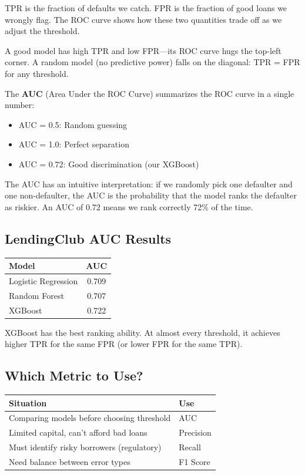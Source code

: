 \documentclass[11pt,a4paper]{article}
\newcommand{\keyword}[1]{\textbf{\textcolor{AccentOrange}{#1}}}
\begin{document}
TPR is the fraction of defaults we catch. FPR is the fraction of good loans we wrongly flag. The ROC curve shows how these two quantities trade off as we adjust the threshold.

A good model has high TPR and low FPR---its ROC curve hugs the top-left corner. A random model (no predictive power) falls on the diagonal: TPR = FPR for any threshold.

The \keyword{AUC} (Area Under the ROC Curve) summarizes the ROC curve in a single number:
\begin{itemize}
    \item AUC = 0.5: Random guessing
    \item AUC = 1.0: Perfect separation
    \item AUC = 0.72: Good discrimination (our XGBoost)
\end{itemize}

The AUC has an intuitive interpretation: if we randomly pick one defaulter and one non-defaulter, the AUC is the probability that the model ranks the defaulter as riskier. An AUC of 0.72 means we rank correctly 72\% of the time.

\subsection{LendingClub AUC Results}

\begin{center}
\begin{tabular}{lc}
\toprule
\textbf{Model} & \textbf{AUC} \\
\midrule
Logistic Regression & 0.709 \\
Random Forest & 0.707 \\
XGBoost & 0.722 \\
\bottomrule
\end{tabular}
\end{center}

XGBoost has the best ranking ability. At almost every threshold, it achieves higher TPR for the same FPR (or lower FPR for the same TPR).

\subsection{Which Metric to Use?}

\begin{center}
\begin{tabular}{ll}
\toprule
\textbf{Situation} & \textbf{Use} \\
\midrule
Comparing models before choosing threshold & AUC \\
Limited capital, can't afford bad loans & Precision \\
Must identify risky borrowers (regulatory) & Recall \\
Need balance between error types & F1 Score \\
\bottomrule
\end{tabular}
\end{center}
\end{document}
